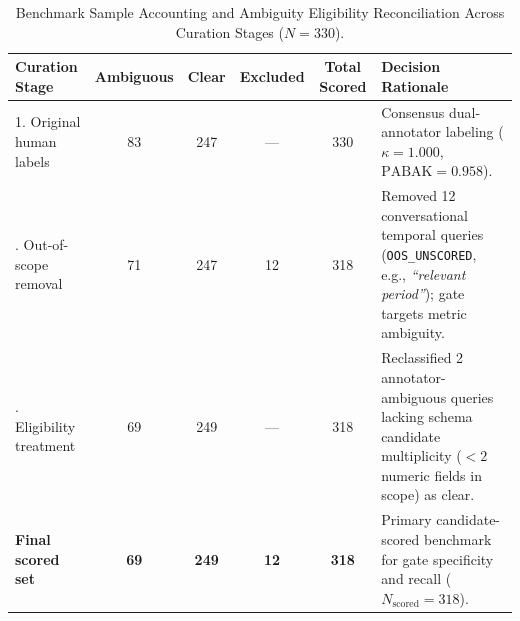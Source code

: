 \begin{table}[t]
\centering
\small
\caption{Benchmark Sample Accounting and Ambiguity Eligibility Reconciliation Across Curation Stages ($N = 330$).}
\label{tab:annotation_flow}
\begin{tabular}{lccccp{4.2cm}}
\toprule
\textbf{Curation Stage} & \textbf{Ambiguous} & \textbf{Clear} & \textbf{Excluded} & \textbf{Total Scored} & \textbf{Decision Rationale} \\
\midrule
1. Original human labels & 83 & 247 & --- & 330 & Consensus dual-annotator labeling ($\kappa = 1.000$, $\text{PABAK} = 0.958$). \\
\addlinespace
2. Out-of-scope removal & 71 & 247 & 12 & 318 & Removed 12 conversational temporal queries (\texttt{OOS\_UNSCORED}, e.g., \emph{``relevant period''}); gate targets metric ambiguity. \\
\addlinespace
3. Eligibility treatment & 69 & 249 & --- & 318 & Reclassified 2 annotator-ambiguous queries lacking schema candidate multiplicity ($< 2$ numeric fields in scope) as clear. \\
\addlinespace
\midrule
\textbf{Final scored set} & \textbf{69} & \textbf{249} & \textbf{12} & \textbf{318} & Primary candidate-scored benchmark for gate specificity and recall ($N_{\text{scored}} = 318$). \\
\bottomrule
\end{tabular}
\end{table}
